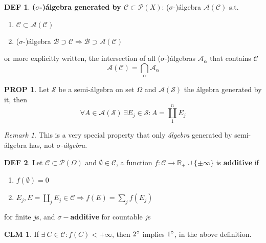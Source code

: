 \documentclass[hidelinks]{article}
\theoremstyle{definition}
\newtheorem*{defin}{DEF}
\theoremstyle{dotless}
\newtheorem{proposition}{PROP}[section]
\newtheorem{claim}{CLM}[section]
\theoremstyle{remark}
\newtheorem*{remark}{Remark}
\begin{document}
\begin{defin}
\textbf{($\sigma$-)álgebra generated by $\mathscr{C}\subset\mathscr{P}(X)$}: ($\sigma$-)álgebra $\mathscr{A}(\mathscr{C})$ s.t.
\begin{enumerate}[label=\arabic*\degree]
    \item $\mathscr{C}\subset\mathscr{A}(\mathscr{C})$
    \item ($\sigma$-)álgebra $\mathscr{B}\supset\mathscr{C}\Rightarrow\mathscr{B}\supset\mathscr{A}(\mathscr{C})$
\end{enumerate}
or more explicitly written, the intersection of all ($\sigma$-)álgebras $\mathscr{A}_\alpha$ that contains $\mathscr{C}$
\[\mathscr{A}(\mathscr{C})=\bigcap\limits_\alpha\mathscr{A}_\alpha\]
\end{defin}

\begin{proposition}\label{Prop 1.1}
Let $\mathscr{S}$ be a semi-álgebra on set $\Omega$ and $\mathscr{A}(\mathscr{S})$ the álgebra generated by it, then
\[\forall A\in\mathscr{A}(\mathscr{S})\ \exists E_j\in\mathscr{S}:A=\coprod_1^nE_j \]
\end{proposition}

\begin{remark}
This is a very special property that only \emph{álgebra} generated by semi-álgebra has, not \emph{$\sigma$-álgebra}.
\end{remark}

\begin{defin}
Let $\mathscr{C}\subset\mathscr{P}(\Omega)$ and $\emptyset\in\mathscr{C}$, a function $f:\mathscr{C}\to\mathbb{R}_+\cup\{\pm\infty\}$ is \textbf{additive} if
\begin{enumerate}[label=\arabic*\degree]
    \item $f(\emptyset)=0$
    \item $E_j,E=\coprod\limits_jE_j\in\mathscr{C}\Rightarrow f(E)=\sum\limits_jf(E_j)$
\end{enumerate} for finite $j$s, and \textbf{$\sigma-$additive} for countable $j$s
\end{defin}

\begin{claim}
If $\exists\ C\in\mathscr{C}:f(C)<+\infty$, then $2\degree$ implies $1\degree$, in the above definition.
\end{claim}
\end{document}
